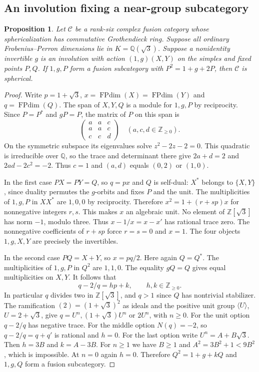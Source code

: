 \documentclass[11pt,reqno]{amsart}
\newtheorem{proposition}[theorem]{Proposition}
\theoremstyle{remark}\newtheorem{remark}[theorem]{Remark}
\numberwithin{equation}{section}
\begin{document}
\subsection{An involution fixing a near-group subcategory}
\begin{proposition}\label{prop:folded-e6-descent}
Let $\mathcal C$ be a rank-six complex fusion category whose
sphericalization has commutative Grothendieck ring. Suppose all
ordinary Frobenius--Perron dimensions lie in $K=\mathbb Q(\sqrt3)$.
Suppose a nonidentity invertible $g$ is an involution with action
$(1,g)(X,Y)$ on the simples and fixed points $P,Q$.
If $1,g,P$ form a fusion subcategory with $P^2=1+g+2P$,
then $\mathcal C$ is spherical.
\end{proposition}
\begin{proof}
Write $p=1+\sqrt3$, $x=\operatorname{FPdim}(X)
=\operatorname{FPdim}(Y)$ and $q=\operatorname{FPdim}(Q)$.
The span of $X,Y,Q$ is a module for $1,g,P$ by reciprocity.
Since $P=P^*$ and $gP=P$, the matrix of $P$ on this span is
\[
 \begin{pmatrix}a&a&c\\a&a&c\\c&c&d\end{pmatrix}
 \quad (a,c,d\in\mathbb Z_{\ge0}).
\]
On the symmetric subspace its eigenvalues solve
$z^2-2z-2=0$. This quadratic is irreducible over $\mathbb Q$, so
the trace and determinant there give $2a+d=2$ and $2ad-2c^2=-2$.
Thus $c=1$ and $(a,d)$ equals $(0,2)$ or $(1,0)$.

In the first case $PX=PY=Q$, so $q=px$ and $Q$ is self-dual:
$X^*$ belongs to $\{X,Y\}$, since duality permutes the
$g$-orbits and fixes $P$ and the unit. The multiplicities of
$1,g,P$ in $XX^*$ are $1,0,0$ by reciprocity. Therefore
$x^2=1+(r+sp)x$ for nonnegative integers $r,s$. This makes $x$
an algebraic unit. No element of $\mathbb Z[\sqrt3]$ has norm
$-1$, modulo three. Thus $x-1/x=x-x'$ has rational trace zero.
The nonnegative coefficients of $r+sp$ force $r=s=0$ and $x=1$.
The four objects $1,g,X,Y$ are precisely the invertibles.

In the second case $PQ=X+Y$, so $x=pq/2$. Here again $Q=Q^*$.
The multiplicities of $1,g,P$ in $Q^2$ are $1,1,0$. The equality
$gQ=Q$ gives equal multiplicities on $X,Y$. It follows that
\[
 q-2/q=h p+k,\qquad h,k\in\mathbb Z_{\ge0}.
\]
In particular $q$ divides two in $\mathbb Z[\sqrt3]$, and
$q>1$ since $Q$ has nontrivial stabilizer. The ramification
$(2)=(1+\sqrt3)^2$ as ideals and the positive unit group
$\langle U\rangle$, $U=2+\sqrt3$, give
$q=U^n,(1+\sqrt3)U^n$ or $2U^n$, with $n\ge0$. For the
unit option $q-2/q$ has negative trace. For the middle option
$N(q)=-2$, so $q-2/q=q+q'$ is rational and $h=0$.
For the last option write $U^n=A+B\sqrt3$. Then
$h=3B$ and $k=A-3B$. For $n\ge1$ we have $B\ge1$ and
$A^2=3B^2+1<9B^2$, which is impossible. At $n=0$ again $h=0$.
Therefore $Q^2=1+g+kQ$ and $1,g,Q$ form a fusion subcategory.


\end{proof}
\end{document}
